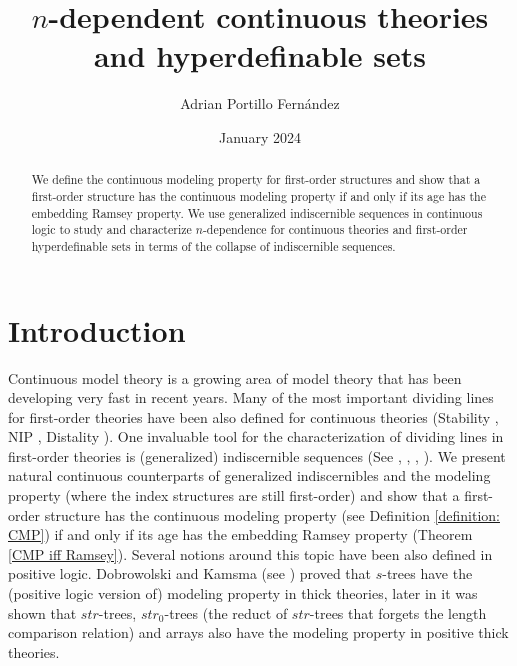\documentclass{amsart}
\title{$n$-dependent continuous theories and hyperdefinable sets }
\author{Adrian Portillo Fernández}
\date{January 2024}
\newtheorem{external claim}[teor]{Claim}
\begin{document}
\begin{abstract}
    We define the continuous modeling property for first-order structures and show that a first-order structure has the continuous modeling property if and only if its age has the embedding Ramsey property. We use generalized indiscernible sequences in continuous logic to study and characterize $n$-dependence  for continuous theories and first-order hyperdefinable sets in terms of the collapse of indiscernible sequences.
\end{abstract}
\maketitle
\section{Introduction}

Continuous model theory is a growing area of model theory that has been developing very fast in recent years. Many of the most important dividing lines for first-order theories have been also defined for continuous theories (Stability \cite{MR2657678, MR2723787}, NIP \cite{ContVCclasses}, Distality \cite{anderson2023fuzzy}). One invaluable tool for the characterization of dividing lines in first-order theories is (generalized) indiscernible sequences (See \cite[Chaper VII]{Shelah1982-SHECTA-5}, \cite{SCOW20121624}, \cite{Chernikov2014OnN}, \cite{Guingona2019}). We present natural continuous counterparts of generalized indiscernibles and the modeling property (where the index structures are still first-order) and show that a first-order structure has the continuous modeling property (see Definition \ref{definition: CMP}) if and only if its age has the embedding Ramsey property (Theorem \ref{CMP iff Ramsey}). Several notions around this topic have been also defined in positive logic. Dobrowolski and Kamsma (see \cite{Dobrowolski2021KimindependenceIP}) proved that $s$-trees have the (positive logic version of) modeling property in thick theories, later in  \cite[Theorems 1.2, 1.2 and 1.3]{kamsma2023positive} it was shown that $str$-trees, $str_0$-trees (the reduct of $str$-trees that forgets the length comparison relation) and arrays also have the modeling property in positive thick theories.
 
\end{document}
